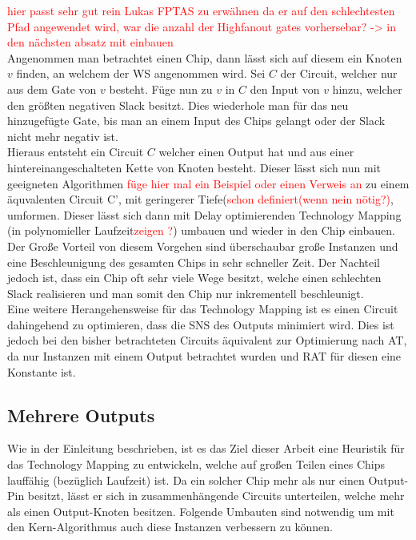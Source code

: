 \documentclass[11pt, a4paper, german]{article}
\newcommand{\TM}{Technology Mapping }
\begin{document}
\textcolor{red}{hier passt sehr gut rein Lukas FPTAS zu erwähnen da er auf den schlechtesten Pfad angewendet wird, war die anzahl der Highfanout gates vorhersebar? -> in den nächsten absatz mit einbauen}\\

Angenommen man betrachtet einen Chip, dann lässt sich auf diesem ein Knoten $v$ finden, an welchem der WS angenommen wird. Sei $C$ der Circuit, welcher nur aus dem Gate von $v$ besteht. Füge nun zu $v$ in $C$ den Input von $v$ hinzu, welcher den größten negativen Slack besitzt. Dies wiederhole man für das neu hinzugefügte Gate, bis man an einem Input des Chips gelangt oder der Slack nicht mehr negativ ist. \\
Hieraus entsteht ein Circuit $C$ welcher einen Output hat und aus einer hintereinangeschalteten Kette von Knoten besteht. Dieser lässt sich nun mit geeigneten Algorithmen \textcolor{red}{füge hier mal ein Beispiel oder einen Verweis an} zu einem äquvalenten Circuit C', mit geringerer Tiefe(\textcolor{red}{schon definiert(wenn nein nötig?)}, umformen. Dieser lässt sich dann mit  Delay optimierenden \TM (in polynomieller Laufzeit\textcolor{red}{zeigen ?}) umbauen und wieder in den Chip einbauen. Der Große Vorteil von diesem Vorgehen sind überschaubar große Instanzen und eine Beschleunigung des gesamten Chips in sehr schneller Zeit. Der Nachteil jedoch ist, dass ein Chip oft sehr viele Wege besitzt, welche einen schlechten Slack realisieren und man somit den Chip nur inkrementell beschleunigt.\\

Eine weitere Herangehensweise für das \TM ist es einen Circuit dahingehend zu optimieren, dass die SNS des Outputs minimiert wird. Dies ist jedoch bei den bisher betrachteten Circuits äquivalent zur Optimierung nach AT, da nur Instanzen mit einem Output betrachtet wurden und RAT für diesen eine Konstante ist.

\subsection{Mehrere Outputs}
\label{subsec:mehrere_outputs}
Wie in der Einleitung beschrieben, ist es das Ziel dieser Arbeit eine Heuristik für das \TM zu entwickeln, welche auf großen Teilen eines Chips lauffähig (bezüglich Laufzeit) ist. Da ein solcher Chip mehr als nur einen Output-Pin besitzt, lässt er sich in zusammenhängende Circuits unterteilen, welche mehr als einen Output-Knoten besitzen. Folgende Umbauten sind notwendig um mit den Kern-Algorithmus auch diese Instanzen verbessern zu können.\\
\end{document}
